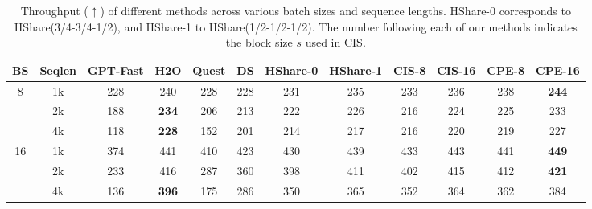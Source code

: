 \begin{table}[t]
\centering
\caption{Throughput ($\uparrow$) of different methods across various batch sizes and sequence lengths. HShare-0 corresponds to HShare(3/4-3/4-1/2), and HShare-1 to HShare(1/2-1/2-1/2). The number following each of our methods indicates the block size $s$ used in CIS.}
\label{tab:throughput}
\begin{tabular}{cccccccc|cccc}
\toprule
BS & Seqlen & GPT-Fast & H2O \cite{zhang2023h2o} & Quest \cite{tang2406quest} & DS \cite{yang2024post} & HShare-0 \cite{wuhshare} & HShare-1 \cite{wuhshare} & CIS-8 & CIS-16 & CPE-8 & CPE-16 \\
\midrule
\multirow{3}{*}{8}
  & 1k & 228 & 240 & 228 & 228 & 231 & 235 & 233 & 236  & 238 & \textbf{244} \\
  & 2k & 188 & \textbf{234} & 206 & 213 & 222 & 226 & 216 & 224  & 225 & 233 \\
  & 4k & 118 & \textbf{228} & 152 & 201 & 214 & 217 & 216 & 220  & 219 & 227 \\
\midrule
\multirow{3}{*}{16}
  & 1k & 374 & 441 & 410 & 423 & 430 & 439 & 433 & 443 & 441 & \textbf{449} \\
  & 2k & 233 & 416 & 287 & 360 & 398 & 411 & 402 & 415 & 412 & \textbf{421} \\
  & 4k & 136 & \textbf{396} & 175 & 286 & 350 & 365 & 352 & 364 & 362 & 384 \\
\bottomrule
\end{tabular}
\end{table}

